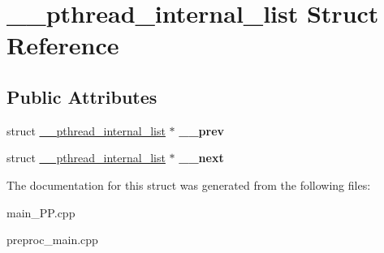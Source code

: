 \hypertarget{struct____pthread__internal__list}{\section{\+\_\+\+\_\+pthread\+\_\+internal\+\_\+list Struct Reference}
\label{struct____pthread__internal__list}
}
\subsection*{Public Attributes}
\begin{DoxyCompactItemize}
\item 
\hypertarget{struct____pthread__internal__list_a2e90cc97076b0ecaa46cca1dd6af5220}{struct \hyperlink{struct____pthread__internal__list}{\+\_\+\+\_\+pthread\+\_\+internal\+\_\+list} $\ast$ {\bfseries \+\_\+\+\_\+prev}}\label{struct____pthread__internal__list_a2e90cc97076b0ecaa46cca1dd6af5220}

\item 
\hypertarget{struct____pthread__internal__list_af435e8fbe0dd4cfa2d3eee2465e29dad}{struct \hyperlink{struct____pthread__internal__list}{\+\_\+\+\_\+pthread\+\_\+internal\+\_\+list} $\ast$ {\bfseries \+\_\+\+\_\+next}}\label{struct____pthread__internal__list_af435e8fbe0dd4cfa2d3eee2465e29dad}

\end{DoxyCompactItemize}


The documentation for this struct was generated from the following files\+:\begin{DoxyCompactItemize}
\item 
main\+\_\+\+P\+P.\+cpp\item 
preproc\+\_\+main.\+cpp\end{DoxyCompactItemize}
